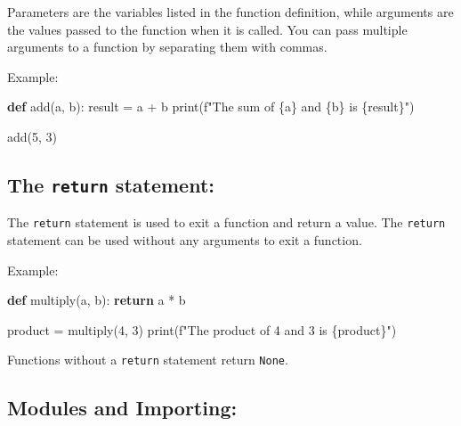 \documentclass[
  paper=a4,
  ,captions=tableheading
]{scrartcl}
\newenvironment{Shaded}{}{}
\newcommand{\BuiltInTok}[1]{\textcolor[rgb]{0.00,0.50,0.00}{#1}}
\newcommand{\ControlFlowTok}[1]{\textcolor[rgb]{0.00,0.44,0.13}{\textbf{#1}}}
\newcommand{\DecValTok}[1]{\textcolor[rgb]{0.25,0.63,0.44}{#1}}
\newcommand{\KeywordTok}[1]{\textcolor[rgb]{0.00,0.44,0.13}{\textbf{#1}}}
\newcommand{\NormalTok}[1]{#1}
\newcommand{\OperatorTok}[1]{\textcolor[rgb]{0.40,0.40,0.40}{#1}}
\newcommand{\SpecialCharTok}[1]{\textcolor[rgb]{0.25,0.44,0.63}{#1}}
\newcommand{\SpecialStringTok}[1]{\textcolor[rgb]{0.73,0.40,0.53}{#1}}
\begin{document}
Parameters are the variables listed in the function definition, while
arguments are the values passed to the function when it is called. You
can pass multiple arguments to a function by separating them with
commas.

Example:

\begin{Shaded}
\begin{Highlighting}[]
\KeywordTok{def}\NormalTok{ add(a, b):}
\NormalTok{    result }\OperatorTok{=}\NormalTok{ a }\OperatorTok{+}\NormalTok{ b}
    \BuiltInTok{print}\NormalTok{(}\SpecialStringTok{f"The sum of }\SpecialCharTok{\{}\NormalTok{a}\SpecialCharTok{\}}\SpecialStringTok{ and }\SpecialCharTok{\{}\NormalTok{b}\SpecialCharTok{\}}\SpecialStringTok{ is }\SpecialCharTok{\{}\NormalTok{result}\SpecialCharTok{\}}\SpecialStringTok{"}\NormalTok{)}

\NormalTok{add(}\DecValTok{5}\NormalTok{, }\DecValTok{3}\NormalTok{)}
\end{Highlighting}
\end{Shaded}

\hypertarget{the-return-statement}{%
\subsection{\texorpdfstring{The \texttt{return}
statement:}{The return statement:}}\label{the-return-statement}}

The \texttt{return} statement is used to exit a function and return a
value. The \texttt{return} statement can be used without any arguments
to exit a function.

Example:

\begin{Shaded}
\begin{Highlighting}[]
\KeywordTok{def}\NormalTok{ multiply(a, b):}
    \ControlFlowTok{return}\NormalTok{ a }\OperatorTok{*}\NormalTok{ b}

\NormalTok{product }\OperatorTok{=}\NormalTok{ multiply(}\DecValTok{4}\NormalTok{, }\DecValTok{3}\NormalTok{)}
\BuiltInTok{print}\NormalTok{(}\SpecialStringTok{f"The product of 4 and 3 is }\SpecialCharTok{\{}\NormalTok{product}\SpecialCharTok{\}}\SpecialStringTok{"}\NormalTok{)}
\end{Highlighting}
\end{Shaded}

Functions without a \texttt{return} statement return \texttt{None}.

\hypertarget{modules-and-importing}{%
\subsection{Modules and Importing:}\label{modules-and-importing}}
\end{document}
